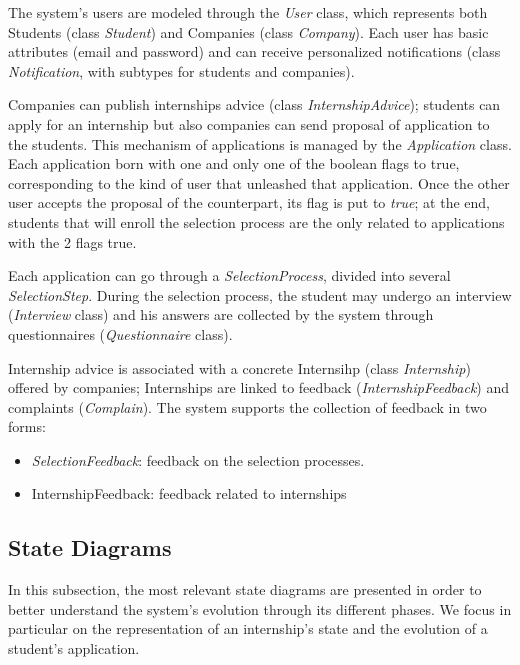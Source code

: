 			The system's users are modeled through the \textit{User} class, which represents both Students (class \textit{Student}) and Companies (class \textit{Company}). Each user has basic attributes (email and password) and can receive personalized notifications (class \textit{Notification}, with subtypes for students and companies).
			
			Companies can publish internships advice (class \textit{InternshipAdvice}); students can apply for an internship but also companies can send proposal of application to the students. This mechanism of applications is managed by the \textit{Application} class. Each application born with one and only one of the boolean flags to true, corresponding to the kind of user that unleashed that application. Once the other user accepts the proposal of the counterpart, its flag is put to \textit{true}; at the end, students that will enroll the selection process are the only related to applications with the 2 flags true.
			
			Each application can go through a \textit{SelectionProcess}, divided into several \textit{SelectionStep}. During the selection process, the student may undergo an interview (\textit{Interview} class) and his answers are collected by the system through questionnaires (\textit{Questionnaire} class).
			
			Internship advice is associated with a concrete Internsihp (class \textit{Internship}) offered by companies; Internships are linked to feedback (\textit{InternshipFeedback}) and complaints (\textit{Complain}). 
			The system supports the collection of feedback in two forms:
			\begin{itemize}
				\item \textit{SelectionFeedback}: feedback on the selection processes.
				\item {InternshipFeedback}: feedback related to internships
			
			\end{itemize}
			
			
			
			
			
			
			
			
			
			\subsection{State Diagrams}
				In this subsection, the most relevant state diagrams are presented in order to better understand the system's evolution through its different phases. We focus in particular on the representation of an internship's state and the evolution of a student's application.
				
